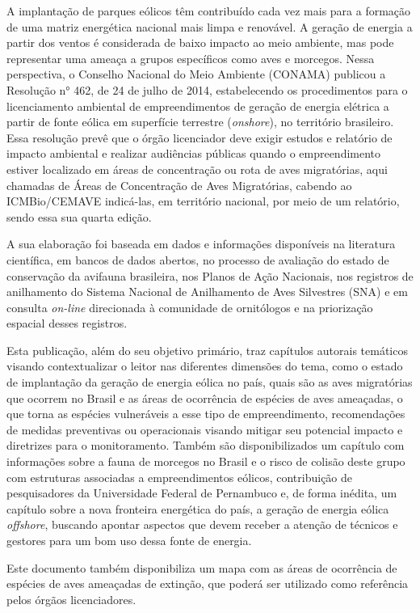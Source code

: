 \documentclass[
  oneside]{scrbook}
\begin{document}
A implantação de parques eólicos têm contribuído cada vez mais para a formação de uma matriz energética nacional mais limpa e renovável. A geração de energia a partir dos ventos é considerada de baixo impacto ao meio ambiente, mas pode representar uma ameaça a grupos específicos como aves e morcegos. Nessa perspectiva, o Conselho Nacional do Meio Ambiente (CONAMA) publicou a Resolução n° 462, de 24 de julho de 2014, estabelecendo os procedimentos para o licenciamento ambiental de empreendimentos de geração de energia elétrica a partir de fonte eólica em superfície terrestre (\emph{onshore}), no território brasileiro. Essa resolução prevê que o órgão licenciador deve exigir estudos e relatório de impacto ambiental e realizar audiências públicas quando o empreendimento estiver localizado em áreas de concentração ou rota de aves migratórias, aqui chamadas de Áreas de Concentração de Aves Migratórias, cabendo ao ICMBio/CEMAVE indicá-las, em território nacional, por meio de um relatório, sendo essa sua quarta edição.

A sua elaboração foi baseada em dados e informações disponíveis na literatura científica, em bancos de dados abertos, no processo de avaliação do estado de conservação da avifauna brasileira, nos Planos de Ação Nacionais, nos registros de anilhamento do Sistema Nacional de Anilhamento de Aves Silvestres (SNA) e em consulta \emph{on-line} direcionada à comunidade de ornitólogos e na priorização espacial desses registros.

Esta publicação, além do seu objetivo primário, traz capítulos autorais temáticos visando contextualizar o leitor nas diferentes dimensões do tema, como o estado de implantação da geração de energia eólica no país, quais são as aves migratórias que ocorrem no Brasil e as áreas de ocorrência de espécies de aves ameaçadas, o que torna as espécies vulneráveis a esse tipo de empreendimento, recomendações de medidas preventivas ou operacionais visando mitigar seu potencial impacto e diretrizes para o monitoramento. Também são disponibilizados um capítulo com informações sobre a fauna de morcegos no Brasil e o risco de colisão deste grupo com estruturas associadas a empreendimentos eólicos, contribuição de pesquisadores da Universidade Federal de Pernambuco e, de forma inédita, um capítulo sobre a nova fronteira energética do país, a geração de energia eólica \emph{offshore}, buscando apontar aspectos que devem receber a atenção de técnicos e gestores para um bom uso dessa fonte de energia.

Este documento também disponibiliza um mapa com as áreas de ocorrência de espécies de aves ameaçadas de extinção, que poderá ser utilizado como referência pelos órgãos licenciadores.
\end{document}
